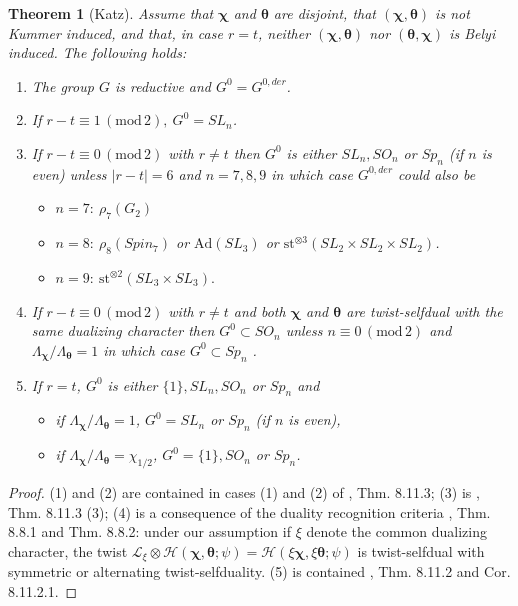 \documentclass[12pt]{amsart}
\theoremstyle{plain}
\newtheorem{thm}{Theorem}[section]
\theoremstyle{definition}
\theoremstyle{remark}
\numberwithin{equation}{section}
\newcommand{\mods}[1]{\,(\mathrm{mod}\,{#1})}
\begin{document}
\begin{thm}[Katz]\label{thm: Katz two set characters}
 Assume that $\bm\chi$ and $\bm\theta$ are disjoint, that $(\bm\chi,\bm\theta)$ is not Kummer induced, and
that, in case $r = t$, neither $(\bm\chi,\bm\theta)$ nor $(\bm\theta,\bm\chi)$ is Belyi induced. The following holds:
\begin{enumerate}
    \item  The group $G$ is reductive and $G^0 = G^{0,der}$.
\item  If $r - t \equiv 1 \mods{2}, \ G^0 = SL_n$.
\item  If $r - t \equiv 0 \mods 2$ with $r \neq t$ then $G^0$ is either $SL_n, SO_n$ or $Sp_n$ (if $n$ is even) 
unless $|r - t| = 6$ and $n = 7, 8, 9$ in which case $G^{0,der}$ could also be
\begin{itemize}
    \item  $n = 7: \ \rho_7(G_2)$
    \item $n = 8: \ \rho_8(Spin_7)$ or $\mathrm{Ad}(SL_3)$ or $\mathrm{st}^{\otimes 3}(SL_2 \times SL_2 \times SL_2)$.
\item  $n=9: \ \mathrm{st}^{\otimes 2}(SL_3\times SL_3).$
\end{itemize}
\item  If $r - t \equiv 0 \mods 2$ with $r\neq t$ and both $\bm\chi$ and $\bm\theta$ are twist-selfdual with the same
dualizing character then $G^0 \subset SO_n$ unless $n \equiv 0 \mods 2$ and $\Lambda_{\bm\chi}/\Lambda_{\bm\theta}=1$ in which
case $G^0 \subset Sp_n$ .
\item  If $r = t$, $G^0$ is either $\{1\}, SL_n, SO_n$ or $Sp_n$ and
\begin{itemize}
    \item  if $\Lambda_{\bm\chi}/\Lambda_{\bm\theta}=1$, $G^0 = SL_n$ or $Sp_n$ (if $n$ is even),
\item if $\Lambda_{\bm\chi}/\Lambda_{\bm\theta}=\chi_{1/2}$, $G^0 = \{1\}, SO_n$ or $Sp_n$.
\end{itemize}
\end{enumerate}
\end{thm}
\begin{proof}
(1) and (2) are contained in cases (1) and (2) of \cite{Katzbook}, Thm. 8.11.3; (3) is \cite{Katzbook}, Thm.
8.11.3 (3); (4) is a consequence of the duality recognition criteria \cite{Katzbook}, Thm. 8.8.1 and
Thm. 8.8.2: under our assumption if $\xi$ denote the common dualizing character, the twist
$\mathscr L_\xi\otimes \mathscr H(\bm \chi ,\bm \theta;\psi)=\mathscr H (\xi\bm \chi,\xi\bm\theta;\psi)$ is twist-selfdual with symmetric or alternating twist-selfduality. (5) is contained \cite{Katzbook}, Thm. 8.11.2 and Cor. 8.11.2.1.\end{proof}
\end{document}
